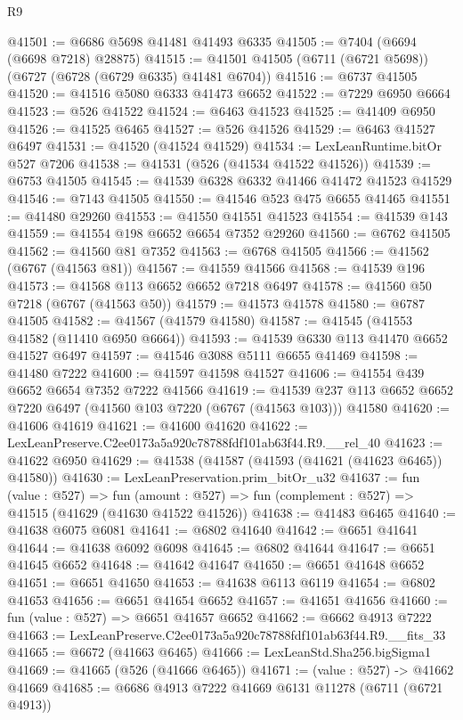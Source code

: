 \begin{lexlean}{R9}
\begin{coremodule}
@41501 := @6686 @5698 @41481 @41493 @6335
@41505 := @7404 (@6694 (@6698 @7218) @28875)
@41515 := @41501 @41505 (@6711 (@6721 @5698)) (@6727 (@6728 (@6729 @6335) @41481 @6704))
@41516 := @6737 @41505
@41520 := @41516 @5080 @6333 @41473 @6652
@41522 := @7229 @6950 @6664
@41523 := @526 @41522
@41524 := @6463 @41523
@41525 := @41409 @6950
@41526 := @41525 @6465
@41527 := @526 @41526
@41529 := @6463 @41527 @6497
@41531 := @41520 (@41524 @41529)
@41534 := LexLeanRuntime.bitOr @527 @7206
@41538 := @41531 (@526 (@41534 @41522 @41526))
@41539 := @6753 @41505
@41545 := @41539 @6328 @6332 @41466 @41472 @41523 @41529
@41546 := @7143 @41505
@41550 := @41546 @523 @475 @6655 @41465
@41551 := @41480 @29260
@41553 := @41550 @41551 @41523
@41554 := @41539 @143
@41559 := @41554 @198 @6652 @6654 @7352 @29260
@41560 := @6762 @41505
@41562 := @41560 @81 @7352
@41563 := @6768 @41505
@41566 := @41562 (@6767 (@41563 @81))
@41567 := @41559 @41566
@41568 := @41539 @196
@41573 := @41568 @113 @6652 @6652 @7218 @6497
@41578 := @41560 @50 @7218 (@6767 (@41563 @50))
@41579 := @41573 @41578
@41580 := @6787 @41505
@41582 := @41567 (@41579 @41580)
@41587 := @41545 (@41553 @41582 (@11410 @6950 @6664))
@41593 := @41539 @6330 @113 @41470 @6652 @41527 @6497
@41597 := @41546 @3088 @5111 @6655 @41469
@41598 := @41480 @7222
@41600 := @41597 @41598 @41527
@41606 := @41554 @439 @6652 @6654 @7352 @7222 @41566
@41619 := @41539 @237 @113 @6652 @6652 @7220 @6497 (@41560 @103 @7220 (@6767 (@41563 @103))) @41580
@41620 := @41606 @41619
@41621 := @41600 @41620
@41622 := LexLeanPreserve.C2ee0173a5a920c78788fdf101ab63f44.R9.__rel_40
@41623 := @41622 @6950
@41629 := @41538 (@41587 (@41593 (@41621 (@41623 @6465)) @41580))
@41630 := LexLeanPreservation.prim_bitOr_u32
@41637 := fun (value : @527) =>
  fun (amount : @527) => fun (complement : @527) => @41515 (@41629 (@41630 @41522 @41526))
@41638 := @41483 @6465
@41640 := @41638 @6075 @6081
@41641 := @6802 @41640
@41642 := @6651 @41641
@41644 := @41638 @6092 @6098
@41645 := @6802 @41644
@41647 := @6651 @41645 @6652
@41648 := @41642 @41647
@41650 := @6651 @41648 @6652
@41651 := @6651 @41650
@41653 := @41638 @6113 @6119
@41654 := @6802 @41653
@41656 := @6651 @41654 @6652
@41657 := @41651 @41656
@41660 := fun (value : @527) => @6651 @41657 @6652
@41662 := @6662 @4913 @7222
@41663 := LexLeanPreserve.C2ee0173a5a920c78788fdf101ab63f44.R9.__fits_33
@41665 := @6672 (@41663 @6465)
@41666 := LexLeanStd.Sha256.bigSigma1
@41669 := @41665 (@526 (@41666 @6465))
@41671 := (value : @527) -> @41662 @41669
@41685 := @6686
    @4913
    @7222
    @41669
    @6131
    @11278
    (@6711 (@6721 @4913))

\end{coremodule}
\end{lexlean}
